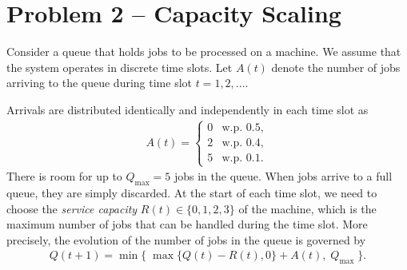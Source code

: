 \documentclass{article}
\begin{document}
\section*{Problem 2 -- Capacity Scaling}

Consider a queue that holds jobs to be processed on a machine.
We assume that the system operates in discrete time slots.
Let $A(t)$ denote the number of jobs arriving to the queue during time slot $t = 1, 2, \dots$.

\begin{figure}[h!]
    \centering
{}
\label{queue}
\end{figure}
\vspace{0.5em}

\noindent
Arrivals are distributed identically and independently in each time slot as
\begin{align*}
    A(t) = \begin{cases}
        0 & \text{w.p. } 0.5, \\
        2 & \text{w.p. } 0.4, \\
        5 & \text{w.p. } 0.1.
    \end{cases}
\end{align*}
There is room for up to $Q_\text{max}=5$ jobs in the queue.
When jobs arrive to a full queue, they are simply discarded.
At the start of each time slot, we need to choose the \textit{service capacity} $R(t) \in \{ 0, 1, 2, 3 \}$ of the machine, which is the maximum number of jobs that can be handled during the time slot.
More precisely, the evolution of the number of jobs in the queue is governed by
\begin{align*}
    Q(t + 1) = \min\{ \; \max \{ Q(t) - R(t), 0 \} + A(t) , \; Q_\text{max} \; \} .
\end{align*}
\end{document}
